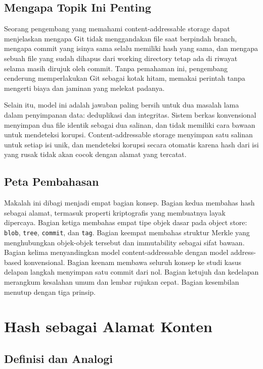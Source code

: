 \documentclass[11pt,a4paper]{article}
\begin{document}
\subsection{Mengapa Topik Ini Penting}

Seorang pengembang yang memahami content-addressable storage dapat menjelaskan mengapa Git tidak menggandakan file saat berpindah branch, mengapa commit yang isinya sama selalu memiliki hash yang sama, dan mengapa sebuah file yang sudah dihapus dari working directory tetap ada di riwayat selama masih dirujuk oleh commit. Tanpa pemahaman ini, pengembang cenderung memperlakukan Git sebagai kotak hitam, memakai perintah tanpa mengerti biaya dan jaminan yang melekat padanya.

Selain itu, model ini adalah jawaban paling bersih untuk dua masalah lama dalam penyimpanan data: deduplikasi dan integritas. Sistem berkas konvensional menyimpan dua file identik sebagai dua salinan, dan tidak memiliki cara bawaan untuk mendeteksi korupsi. Content-addressable storage menyimpan satu salinan untuk setiap isi unik, dan mendeteksi korupsi secara otomatis karena hash dari isi yang rusak tidak akan cocok dengan alamat yang tercatat.

\subsection{Peta Pembahasan}

Makalah ini dibagi menjadi empat bagian konsep. Bagian kedua membahas hash sebagai alamat, termasuk properti kriptografis yang membuatnya layak dipercaya. Bagian ketiga membahas empat tipe objek dasar pada object store: \texttt{blob}, \texttt{tree}, \texttt{commit}, dan \texttt{tag}. Bagian keempat membahas struktur Merkle yang menghubungkan objek-objek tersebut dan immutability sebagai sifat bawaan. Bagian kelima menyandingkan model content-addressable dengan model address-based konvensional. Bagian keenam membawa seluruh konsep ke studi kasus delapan langkah menyimpan satu commit dari nol. Bagian ketujuh dan kedelapan merangkum kesalahan umum dan lembar rujukan cepat. Bagian kesembilan menutup dengan tiga prinsip.

\section{Hash sebagai Alamat Konten}

\subsection{Definisi dan Analogi}
\end{document}

